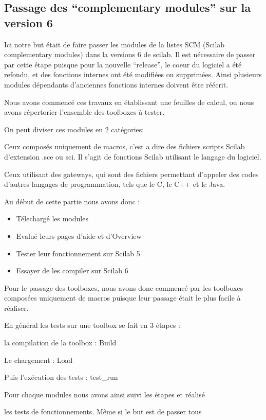 \subsection*{Passage des ``complementary modules'' sur la version 6}

Ici notre but était de faire passer les modules de la listes SCM (Scilab complementary modules) dans la versions 6 de scilab. Il est nécessaire de passer par cette étape puisque pour la nouvelle “release”, le coeur du logiciel a été refondu, et des fonctions internes ont été modifiées ou supprimées. Ainsi plusieurs modules dépendants d’anciennes fonctions internes doivent être réécrit.

Nous avons commencé ces travaux en établissant une feuilles de calcul, ou nous avons répertorier l’ensemble des toolboxes à tester.

On peut diviser ces modules en 2 catégories:

Ceux composés uniquement de macros, c’est a dire des fichiers scripts Scilab d’extension .sce ou sci. Il s’agit de fonctions Scilab utilisant le langage du logiciel.

Ceux utilisant des gateways, qui sont des fichiers permettant d’appeler des codes d’autres langages de programmation, tels que le C, le C++ et le Java.

Au début de cette partie nous avons donc :

\begin{itemize}
\item Télechargé les modules
\item Evalué leurs pages d’aide et d’Overview
\item Tester leur fonctionnement sur Scilab 5
\item Essayer de les compiler sur Scilab 6
\end{itemize}

Pour le passage des toolboxes, nous avons donc commencé par les toolboxes composées uniquement de macros puisque leur passage était le plus facile à réaliser.

En général les tests sur une toolbox se fait en 3 étapes :

la compilation de la toolbox : Build

Le chargement : Load

Puis l'exécution des tests : test\_run

Pour chaque modules nous avons ainsi suivi les étapes et réalisé

les tests de fonctionnements. Même si le but est de passer tous

